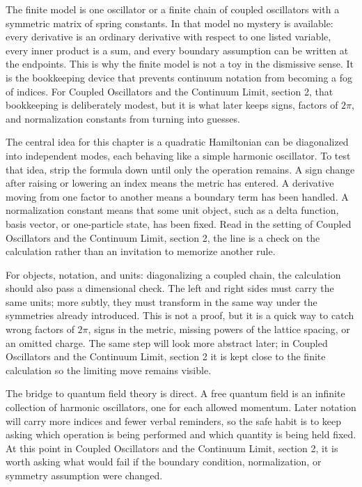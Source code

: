 The finite model is one oscillator or a finite chain of coupled oscillators with a symmetric matrix of spring constants.  In that model no mystery is available: every derivative is an ordinary derivative with respect to one listed variable, every inner product is a sum, and every boundary assumption can be written at the endpoints.  This is why the finite model is not a toy in the dismissive sense.  It is the bookkeeping device that prevents continuum notation from becoming a fog of indices.  For Coupled Oscillators and the Continuum Limit, section 2, that bookkeeping is deliberately modest, but it is what later keeps signs, factors of \(2\pi\), and normalization constants from turning into guesses.

The central idea for this chapter is a quadratic Hamiltonian can be diagonalized into independent modes, each behaving like a simple harmonic oscillator.  To test that idea, strip the formula down until only the operation remains.  A sign change after raising or lowering an index means the metric has entered.  A derivative moving from one factor to another means a boundary term has been handled.  A normalization constant means that some unit object, such as a delta function, basis vector, or one-particle state, has been fixed.  Read in the setting of Coupled Oscillators and the Continuum Limit, section 2, the line is a check on the calculation rather than an invitation to memorize another rule.

For objects, notation, and units: diagonalizing a coupled chain, the calculation should also pass a dimensional check.  The left and right sides must carry the same units; more subtly, they must transform in the same way under the symmetries already introduced.  This is not a proof, but it is a quick way to catch wrong factors of \(2\pi\), signs in the metric, missing powers of the lattice spacing, or an omitted charge.  The same step will look more abstract later; in Coupled Oscillators and the Continuum Limit, section 2 it is kept close to the finite calculation so the limiting move remains visible.

The bridge to quantum field theory is direct.  A free quantum field is an infinite collection of harmonic oscillators, one for each allowed momentum.  Later notation will carry more indices and fewer verbal reminders, so the safe habit is to keep asking which operation is being performed and which quantity is being held fixed.  At this point in Coupled Oscillators and the Continuum Limit, section 2, it is worth asking what would fail if the boundary condition, normalization, or symmetry assumption were changed.

